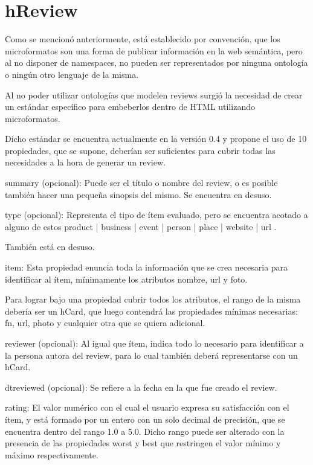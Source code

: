 \section{hReview}
\label{section:hreview}

Como se mencionó anteriormente, está establecido por convención, que los microformatos son una forma de publicar información en la 
web semántica, pero al no disponer de namespaces, no pueden ser representados por ninguna ontología o ningún otro lenguaje de la misma. 


Al no poder utilizar ontologías que modelen reviews surgió la necesidad de crear un estándar específico para embeberlos dentro de HTML 
utilizando microformatos.

Dicho estándar se encuentra actualmente en la versión 0.4 y propone el uso de 10 propiedades, que se supone, deberían ser 
suficientes para cubrir todas las necesidades a la hora de generar un review.

summary (opcional): Puede ser el título o nombre del review, o es posible también hacer una pequeña sinopsis del mismo. Se encuentra en desuso.

type (opcional): Representa el tipo de ítem evaluado, pero se encuentra acotado a alguno de estos  product | business | event | person | place | website | url .


También está en desuso.

item: Esta propiedad enuncia toda la información que se crea necesaria para identificar al ítem, mínimamente los atributos nombre, url y foto.


Para lograr bajo una propiedad cubrir todos los atributos, el rango de la misma debería ser un hCard, que luego contendrá las propiedades mínimas necesarias: 
fn, url, photo y cualquier otra que se quiera adicional.

reviewer (opcional): Al igual que ítem, indica todo lo necesario para identificar a la persona autora del review, para lo cual también deberá representarse 
con un hCard. 

dtreviewed (opcional): Se refiere a la fecha en la que fue creado el review. 

rating: El valor numérico con el cual el usuario expresa su satisfacción con el ítem, y está formado por un entero con un solo decimal 
de precisión, que se encuentra dentro del rango 1.0 a 5.0. Dicho rango puede ser alterado con la presencia de las propiedades worst y best 
que restringen el valor mínimo y máximo respectivamente.

